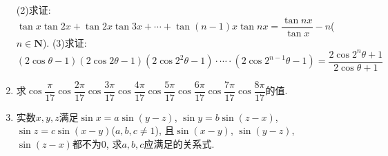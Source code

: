 \documentclass[10pt,a4paper]{article}
\begin{document}
\begin{enumerate}[1.]
(2)求证: $\tan x\tan 2x+\tan 2x\tan 3x+\cdots +\tan (n-1)x\tan nx=\dfrac{\tan nx}{\tan x}-n$($n\in \mathbf{N}$).
(3)求证: $(2\cos \theta -1)(2\cos 2\theta -1)(2\cos 2^2\theta -1)\cdot \cdots \cdot (2\cos 2^{n-1}\theta -1)=\dfrac{2\cos 2^n\theta +1}{2\cos \theta +1}$
\item 求$\cos \dfrac{\pi }{17}\cos \dfrac{2\pi }{17}\cos \dfrac{3\pi }{17}\cos \dfrac{4\pi }{17}\cos \dfrac{5\pi }{17}\cos \dfrac{6\pi }{17}\cos \dfrac{7\pi }{17}\cos \dfrac{8\pi }{17}$的值.
\item 实数$x,y,z$满足$\sin x=a\sin (y-z)$, $\sin y=b\sin (z-x)$, $\sin z=c\sin (x-y)$($a,b,c\ne 1$), 且$\sin (x-y)$, $\sin (y-z)$, $\sin (z-x)$都不为0, 求$a,b,c$应满足的关系式.
    
    
\end{enumerate}
\end{document}
